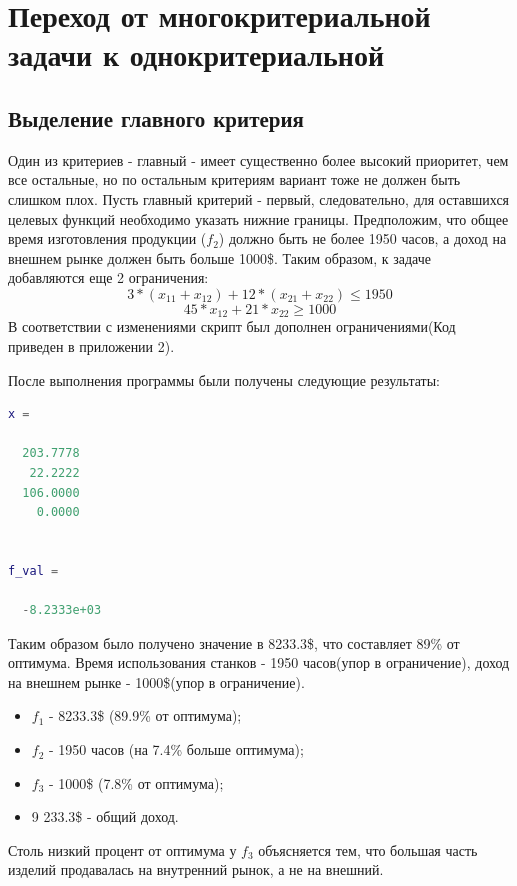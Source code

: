 \section{Переход от многокритериальной задачи к однокритериальной}
\subsection{Выделение главного критерия}


Один из критериев - главный - имеет существенно более высокий приоритет, чем все остальные, но по остальным критериям вариант тоже не должен быть слишком плох. Пусть главный критерий - первый, следовательно, для оставшихся целевых функций необходимо указать нижние границы. Предположим, что общее время изготовления продукции ($f_2$) должно быть не более 1950 часов, а доход на внешнем рынке должен быть больше 1000\$. Таким образом, к задаче добавляются еще 2 ограничения:
\begin{equation}
3*(x_{11}+x_{12})+12*(x_{21}+x_{22})\leq 1950 
\end{equation}
\begin{equation}
45*x_{12}+21*x_{22}\geq 1000
\end{equation}
В соответствии с изменениями скрипт был дополнен ограничениями(Код приведен в приложении 2).

После выполнения программы были получены следующие результаты:
\begin{lstlisting}[language={matlab}, caption={Результаты выполнения листинга \ref{lst:2}}]
x =

  203.7778
   22.2222
  106.0000
    0.0000


f_val =

  -8.2333e+03
\end{lstlisting}
Таким образом было получено значение в 8233.3\$, что составляет 89\% от оптимума. 
Время использования станков - 1950 часов(упор в ограничение), доход на внешнем рынке - 1000\$(упор в ограничение).
\begin{itemize}
\item $f_1$ - 8233.3\$ (89.9\% от оптимума);
\item $f_2$ - 1950 часов (на 7.4\% больше оптимума);
\item $f_3$ - 1000\$ (7.8\% от оптимума);
\item 9 233.3\$ - общий доход.
\end{itemize}
Столь низкий процент от оптимума у $f_3$ объясняется тем, что большая часть изделий продавалась на внутренний рынок, а не на внешний.



